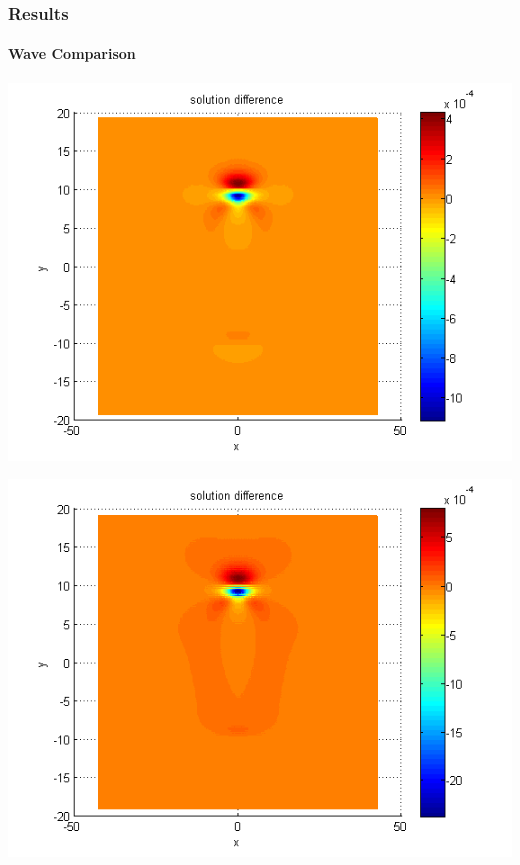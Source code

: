 \documentclass{beamer}
\begin{document}
\begin{frame}
\frametitle{Results}
\framesubtitle{Wave Comparison}
\begin{center}\vspace{0.4cm}
	\begin{minipage}[b]{0.30\linewidth}
		\includegraphics[width=\linewidth]{figures/compare_128_bt1_c09_h010.png}
	\end{minipage}	
	\begin{minipage}[b]{0.30\linewidth}
		\includegraphics[width=\linewidth]{figures/compare_128_bt1_c09_h020.png}
	\end{minipage}	
	\begin{minipage}[b]{0.30\linewidth}

\end{minipage}
\end{center}
\end{frame}
\end{document}
